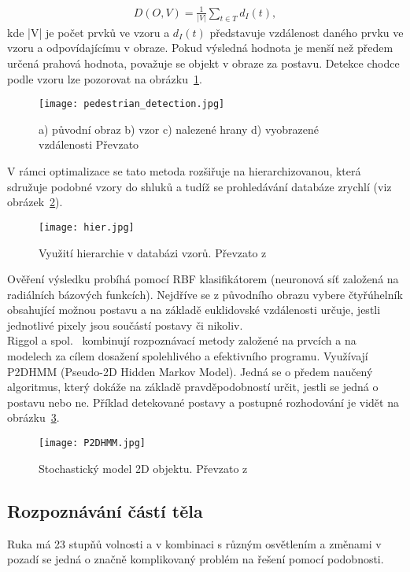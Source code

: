 \begin{eqnarray}
 D(O,V) = \frac{1}{|V|}\sum_{t\in T}^{}d_{I}(t) ,
\end{eqnarray}
kde |V| je počet prvků ve vzoru a $ d_{I}(t) $ představuje vzdálenost daného prvku ve vzoru a odpovídajícímu v obraze. Pokud výsledná hodnota je menší než předem určená prahová hodnota, považuje se objekt v obraze za postavu. Detekce chodce podle vzoru lze pozorovat na obrázku~\ref{pic3}. \\
\newpage
\begin{figure}[h]
\centering
\texttt{[image: pedestrian\_detection.jpg]}
\caption{a) původní obraz b) vzor c) nalezené hrany d) vyobrazené vzdálenosti
Převzato ~\cite{7} }
\label{pic3}
\end{figure} 
V rámci optimalizace se tato metoda rozšiřuje na hierarchizovanou, která sdružuje podobné vzory do shluků a tudíž se prohledávání databáze zrychlí (viz obrázek~\ref{pic4}).
\begin{figure}[h]
\centering
\texttt{[image: hier.jpg]}
\caption{Využití hierarchie v databázi vzorů. Převzato z ~\cite{7} }
\label{pic4}
\end{figure}
\newpage

Ověření výsledku probíhá pomocí RBF klasifikátorem (neuronová síť založená na radiálních bázových funkcích). Nejdříve se z původního obrazu vybere čtyřúhelník obsahující možnou postavu a na základě euklidovské vzdálenosti určuje, jestli jednotlivé pixely jsou součástí postavy či nikoliv.\\

Riggol a spol.~\cite{11} kombinují rozpoznávací metody založené na prvcích a na modelech za cílem dosažení spolehlivého a efektivního programu. Využívají P2DHMM (Pseudo-2D Hidden Markov Model). Jedná se o předem naučený algoritmus, který dokáže na základě pravděpodobností určit, jestli se jedná o postavu nebo ne. Příklad detekované postavy a postupné rozhodování je vidět na obrázku~\ref{pic5}.\\
\begin{figure}[h]
\centering
\texttt{[image: P2DHMM.jpg]}
\caption{Stochastický model 2D objektu. Převzato z ~\cite{11} } %
\label{pic5}
\end{figure}


\subsection{Rozpoznávání částí těla}
Ruka má 23 stupňů volnosti a v kombinaci s různým osvětlením a změnami v pozadí se jedná o značně komplikovaný problém na řešení pomocí podobnosti.\\

